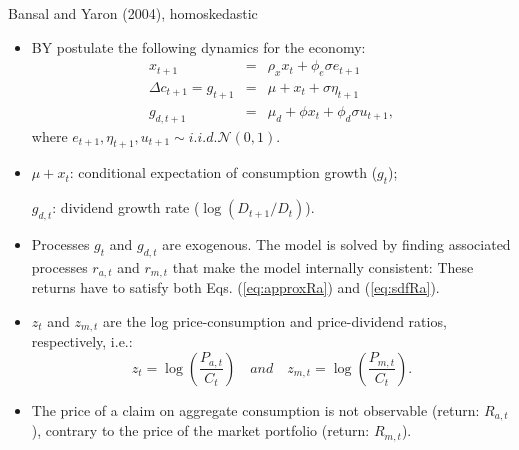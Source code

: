 \begin{frame}{Bansal and Yaron (2004), homoskedastic}
\begin{footnotesize}
\begin{itemize}
	\item BY postulate the following dynamics for the economy:
	\begin{eqnarray*}
	x_{t+1} &=& \rho_x x_t + \phi_e \sigma e_{t+1}\\
	\Delta c_{t+1} = g_{t+1} &=& \mu + x_t + \sigma \eta_{t+1}\\
	g_{d,t+1} &=& \mu_d + \phi x_t + \phi_d \sigma u_{t+1},
	\end{eqnarray*}
	where $e_{t+1},\eta_{t+1},u_{t+1} \sim i.i.d. \mathcal{N}(0,1)$.
	\item $\mu + x_t$: conditional expectation of consumption growth ($g_t$);
	
	$g_{d,t}$: dividend growth rate ($\log(D_{t+1}/D_t)$).
	\item Processes $g_t$ and $g_{d,t}$ are exogenous. The model is solved by finding associated processes $r_{a,t}$ and $r_{m,t}$ that make the model internally consistent:
	These returns have to satisfy both Eqs. (\ref{eq:approxRa}) and (\ref{eq:sdfRa}).
	\item $z_t$ and $z_{m,t}$ are the {\color{blue}log price-consumption} and {\color{blue}price-dividend ratios}, respectively, i.e.:
	$$
	z_t = \log\left(\frac{P_{a,t}}{C_t}\right) \quad and \quad z_{m,t} = \log\left(\frac{P_{m,t}}{C_t}\right).
	$$
	\item The price of a claim on aggregate consumption is not observable (return: $R_{a,t}$), contrary to the price of the market portfolio (return: $R_{m,t}$).
\end{itemize}
\end{footnotesize}
\end{frame}

